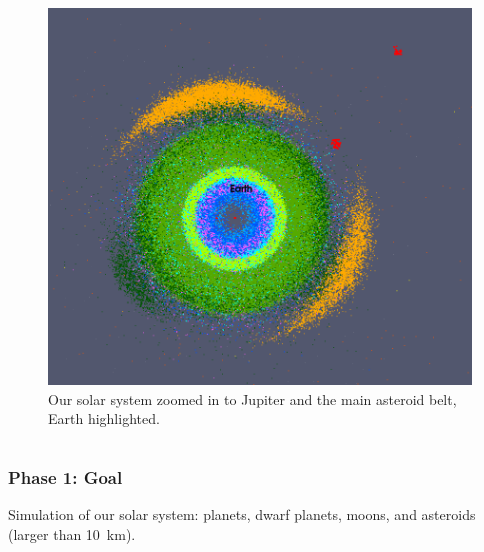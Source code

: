 \begin{frame}
\begin{columns}
\begin{column}{.45\linewidth}
\begin{figure}
	            \includegraphics[width=.9\columnwidth]{figures/all_bodies_inner_system}
	            \caption{\setfontsize{10pt}Our solar system zoomed in to Jupiter and the main asteroid belt, Earth highlighted.}
	        \end{figure}
	    \end{column}
	\end{columns}
\end{frame}

\begin{frame}[fragile, c]
  \frametitle{Phase 1: Goal}
  \vspace*{-1em}
  \begin{center}
      Simulation of our solar system: planets, dwarf planets, moons, and asteroids \\(larger than \SI{10}{\kilo\meter}).\\[0.5em]

  \end{center}
\end{frame}

